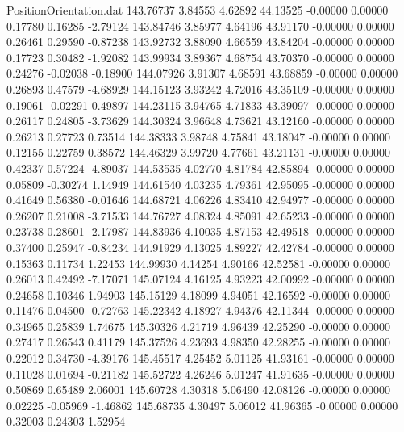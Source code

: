 \begin{filecontents}{PositionOrientation.dat}
 143.76737    3.84553    4.62892    44.13525   -0.00000    0.00000    0.17780    0.16285   -2.79124
 143.84746    3.85977    4.64196    43.91170   -0.00000    0.00000    0.26461    0.29590   -0.87238
 143.92732    3.88090    4.66559    43.84204   -0.00000    0.00000    0.17723    0.30482   -1.92082
 143.99934    3.89367    4.68754    43.70370   -0.00000    0.00000    0.24276   -0.02038   -0.18900
 144.07926    3.91307    4.68591    43.68859   -0.00000    0.00000    0.26893    0.47579   -4.68929
 144.15123    3.93242    4.72016    43.35109   -0.00000    0.00000    0.19061   -0.02291    0.49897
 144.23115    3.94765    4.71833    43.39097   -0.00000    0.00000    0.26117    0.24805   -3.73629
 144.30324    3.96648    4.73621    43.12160   -0.00000    0.00000    0.26213    0.27723    0.73514
 144.38333    3.98748    4.75841    43.18047   -0.00000    0.00000    0.12155    0.22759    0.38572
 144.46329    3.99720    4.77661    43.21131   -0.00000    0.00000    0.42337    0.57224   -4.89037
 144.53535    4.02770    4.81784    42.85894   -0.00000    0.00000    0.05809   -0.30274    1.14949
 144.61540    4.03235    4.79361    42.95095   -0.00000    0.00000    0.41649    0.56380   -0.01646
 144.68721    4.06226    4.83410    42.94977   -0.00000    0.00000    0.26207    0.21008   -3.71533
 144.76727    4.08324    4.85091    42.65233   -0.00000    0.00000    0.23738    0.28601   -2.17987
 144.83936    4.10035    4.87153    42.49518   -0.00000    0.00000    0.37400    0.25947   -0.84234
 144.91929    4.13025    4.89227    42.42784   -0.00000    0.00000    0.15363    0.11734    1.22453
 144.99930    4.14254    4.90166    42.52581   -0.00000    0.00000    0.26013    0.42492   -7.17071
 145.07124    4.16125    4.93223    42.00992   -0.00000    0.00000    0.24658    0.10346    1.94903
 145.15129    4.18099    4.94051    42.16592   -0.00000    0.00000    0.11476    0.04500   -0.72763
 145.22342    4.18927    4.94376    42.11344   -0.00000    0.00000    0.34965    0.25839    1.74675
 145.30326    4.21719    4.96439    42.25290   -0.00000    0.00000    0.27417    0.26543    0.41179
 145.37526    4.23693    4.98350    42.28255   -0.00000    0.00000    0.22012    0.34730   -4.39176
 145.45517    4.25452    5.01125    41.93161   -0.00000    0.00000    0.11028    0.01694   -0.21182
 145.52722    4.26246    5.01247    41.91635   -0.00000    0.00000    0.50869    0.65489    2.06001
 145.60728    4.30318    5.06490    42.08126   -0.00000    0.00000    0.02225   -0.05969   -1.46862
 145.68735    4.30497    5.06012    41.96365   -0.00000    0.00000    0.32003    0.24303    1.52954

\end{filecontents}

